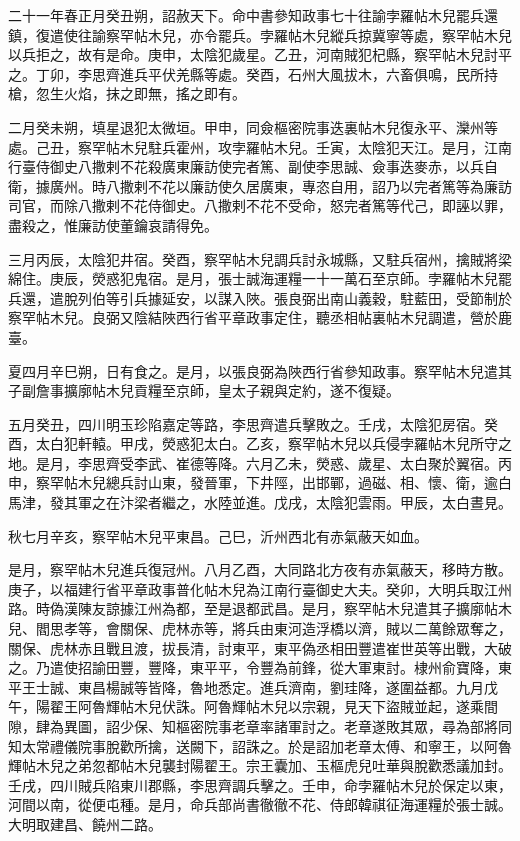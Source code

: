 
\begin{pinyinscope}

 二十一年春正月癸丑朔，詔赦天下。命中書參知政事七十往諭孛羅帖木兒罷兵還鎮，復遣使往諭察罕帖木兒，亦令罷兵。孛羅帖木兒縱兵掠冀寧等處，察罕帖木兒以兵拒之，故有是命。庚申，太陰犯歲星。乙丑，河南賊犯杞縣，察罕帖木兒討平之。丁卯，李思齊進兵平伏羌縣等處。癸酉，石州大風拔木，六畜俱鳴，民所持槍，忽生火焰，抹之即無，搖之即有。



 二月癸未朔，填星退犯太微垣。甲申，同僉樞密院事迭裏帖木兒復永平、灤州等處。己丑，察罕帖木兒駐兵霍州，攻孛羅帖木兒。壬寅，太陰犯天江。是月，江南行臺侍御史八撒剌不花殺廣東廉訪使完者篤、副使李思誠、僉事迭麥赤，以兵自衛，據廣州。時八撒剌不花以廉訪使久居廣東，專恣自用，詔乃以完者篤等為廉訪司官，而除八撒剌不花侍御史。八撒剌不花不受命，怒完者篤等代己，即誣以罪，盡殺之，惟廉訪使董鑰哀請得免。



 三月丙辰，太陰犯井宿。癸酉，察罕帖木兒調兵討永城縣，又駐兵宿州，擒賊將梁綿住。庚辰，熒惑犯鬼宿。是月，張士誠海運糧一十一萬石至京師。孛羅帖木兒罷兵還，遣脫列伯等引兵據延安，以謀入陜。張良弼出南山義穀，駐藍田，受節制於察罕帖木兒。良弼又陰結陜西行省平章政事定住，聽丞相帖裏帖木兒調遣，營於鹿臺。



 夏四月辛巳朔，日有食之。是月，以張良弼為陜西行省參知政事。察罕帖木兒遣其子副詹事擴廓帖木兒貢糧至京師，皇太子親與定約，遂不復疑。



 五月癸丑，四川明玉珍陷嘉定等路，李思齊遣兵擊敗之。壬戌，太陰犯房宿。癸酉，太白犯軒轅。甲戌，熒惑犯太白。乙亥，察罕帖木兒以兵侵孛羅帖木兒所守之地。是月，李思齊受李武、崔德等降。六月乙未，熒惑、歲星、太白聚於翼宿。丙申，察罕帖木兒總兵討山東，發晉軍，下井陘，出邯鄲，過磁、相、懷、衛，逾白馬津，發其軍之在汴梁者繼之，水陸並進。戊戌，太陰犯雲雨。甲辰，太白晝見。



 秋七月辛亥，察罕帖木兒平東昌。己巳，沂州西北有赤氣蔽天如血。



 是月，察罕帖木兒進兵復冠州。八月乙酉，大同路北方夜有赤氣蔽天，移時方散。庚子，以福建行省平章政事普化帖木兒為江南行臺御史大夫。癸卯，大明兵取江州路。時偽漢陳友諒據江州為都，至是退都武昌。是月，察罕帖木兒遣其子擴廓帖木兒、閻思孝等，會關保、虎林赤等，將兵由東河造浮橋以濟，賊以二萬餘眾奪之，關保、虎林赤且戰且渡，拔長清，討東平，東平偽丞相田豐遣崔世英等出戰，大破之。乃遣使招諭田豐，豐降，東平平，令豐為前鋒，從大軍東討。棣州俞寶降，東平王士誠、東昌楊誠等皆降，魯地悉定。進兵濟南，劉珪降，遂圍益都。九月戊午，陽翟王阿魯輝帖木兒伏誅。阿魯輝帖木兒以宗親，見天下盜賊並起，遂乘間隙，肆為異圖，詔少保、知樞密院事老章率諸軍討之。老章遂敗其眾，尋為部將同知太常禮儀院事脫歡所擒，送闕下，詔誅之。於是詔加老章太傅、和寧王，以阿魯輝帖木兒之弟忽都帖木兒襲封陽翟王。宗王囊加、玉樞虎兒吐華與脫歡悉議加封。壬戌，四川賊兵陷東川郡縣，李思齊調兵擊之。壬申，命孛羅帖木兒於保定以東，河間以南，從便屯種。是月，命兵部尚書徹徹不花、侍郎韓祺征海運糧於張士誠。大明取建昌、饒州二路。




\end{pinyinscope}
